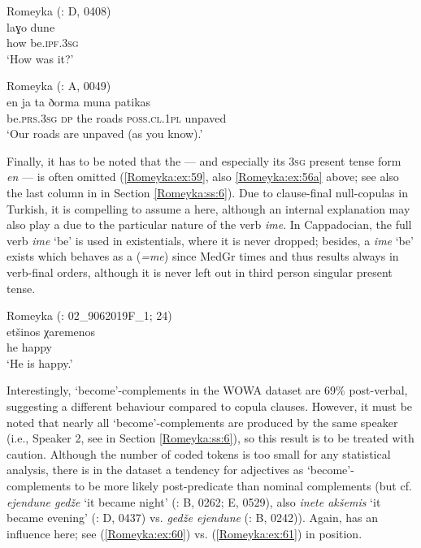 \documentclass[output=paper,colorlinks,citecolor=brown]{langscibook}
\begin{document}
\ea\label{Romeyka:ex:57}
Romeyka (\citealt{schreiber2021pontic}: D, 0408) \\
\gll laɣo dune \\
how be\textsc{.ipf.3sg} \\
\glt `How was it?'  \\
\z

\ea\label{Romeyka:ex:58}
Romeyka (\citealt{schreiber2021pontic}: A, 0049) \\
\gll en ja ta ðorma muna patikas \\
be\textsc{.prs.3sg} \textsc{dp} the roads \textsc{poss.cl.1pl} unpaved \\
\glt `Our roads are unpaved (as you know).'
\z

Finally, it has to be noted that the  --- and especially its \textsc{3sg} present tense form \textit{en} --- is often omitted (\ref{Romeyka:ex:59}, also \ref{Romeyka:ex:56a} above; see also the last column in  in Section \ref{Romeyka:ss:6}). Due to clause-final null-copulas in Turkish, it is compelling to assume a  here, although an internal explanation may also play a  due to the particular nature of the verb \textit{ime}. In Cappadocian, the full verb \textit{ime} `be' is used in existentials, where it is never dropped; besides, a  \textit{ime} `be' exists which behaves as a  (\textit{=me}) since MedGr times and thus results always in verb-final orders, although it is never left out in third person singular present tense.

\ea\label{Romeyka:ex:59}
Romeyka (\citealt{schreiber_inprep}: 02\_9062019F\_1; 24) \\
\gll etšinos χaremenos \\
he happy \\
\glt `He is happy.'  \\
\z

\begin{sloppypar}
Interestingly, `become'-complements in the WOWA dataset are 69\% post-verbal, suggesting a different behaviour compared to copula clauses. However, it must be noted that nearly all `become'-complements are produced by the same speaker (i.e., Speaker 2, see  in Section \ref{Romeyka:ss:6}), so this result is to be treated with caution. Although the number of coded tokens is too small for any statistical analysis, there is in the dataset a tendency for adjectives as `become'-complements to be more likely post-predicate than nominal complements (but cf. \textit{ejendune gedže} `it became night' (\citealt{schreiber2021pontic}: B, 0262; E, 0529), also \textit{inete akšemis} `it became evening' (\citealt{schreiber2021pontic}: D, 0437) vs. \textit{gedže ejendune} (\citealt{schreiber2021pontic}: B, 0242)). Again,  has an influence here; see (\ref{Romeyka:ex:60}) vs. (\ref{Romeyka:ex:61}) in  position.
\end{sloppypar}
\end{document}
